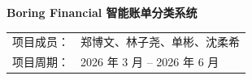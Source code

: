 \documentclass[UTF8,zihao=-4,openany,fontset=none]{ctexrep}
\newcommand{\projectname}{Boring Financial 智能账单分类系统}
\begin{document}
\begin{titlepage}
  \thispagestyle{empty}
  \centering
  \vspace*{3.2cm}
  {\bfseries \projectname\par}
  \vspace{2.2cm}
  {
  \begin{tabular}{rl}
    项目成员：& 郑博文、林子尧、单彬、沈柔希 \\
    \addlinespace[0.45cm]
    项目周期：& 2026 年 3 月 -- 2026 年 6 月
  \end{tabular}
  }
\end{titlepage}
\restoregeometry

\tableofcontents
\clearpage











\end{document}
